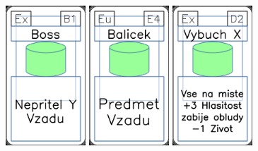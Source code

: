 \documentclass[a4paper]{article}
\begin{document}
	\includegraphics[width=3.0cm]{img-4_5}
	\includegraphics[width=3.0cm]{img-4_23}
	\includegraphics[width=3.0cm]{img-4_16}
\end{document}
